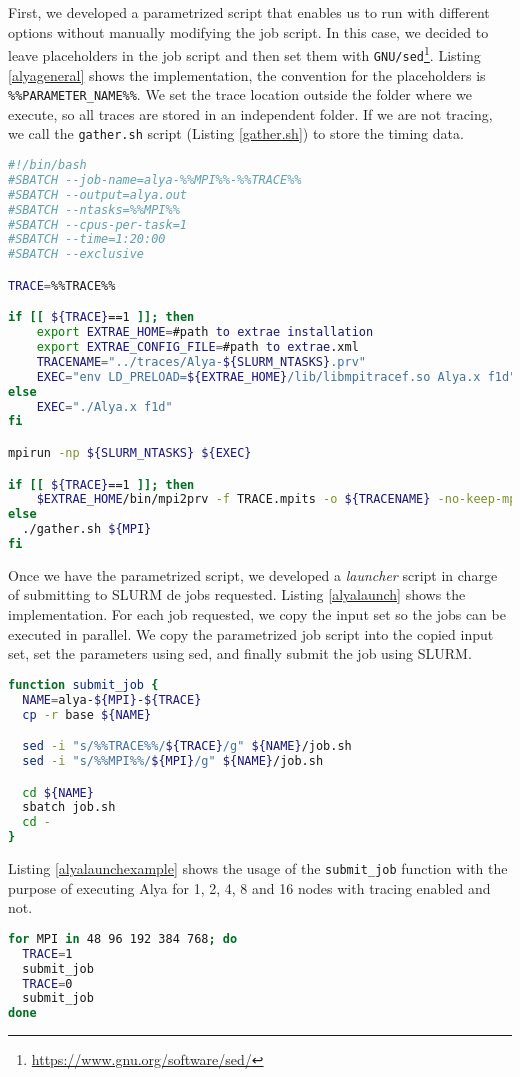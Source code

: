 First, we developed a parametrized script that enables us to run with different options without manually modifying the job script. In this case, we decided to leave placeholders in the job script and then set them with \texttt{GNU/sed}\footnote{\url{https://www.gnu.org/software/sed/}}. Listing \ref{alyageneral} shows the implementation, the convention for the placeholders is \texttt{\%\%PARAMETER\_NAME\%\%}. We set the trace location outside the folder where we execute, so all traces are stored in an independent folder. If we are not tracing, we call the \texttt{gather.sh} script (Listing \ref{gather.sh}) to store the timing data.

\begin{lstlisting}[language=sh, caption={Parametrized alya script.}, label={alyageneral}]
#!/bin/bash
#SBATCH --job-name=alya-%%MPI%%-%%TRACE%%
#SBATCH --output=alya.out
#SBATCH --ntasks=%%MPI%%
#SBATCH --cpus-per-task=1
#SBATCH --time=1:20:00
#SBATCH --exclusive

TRACE=%%TRACE%%

if [[ ${TRACE}==1 ]]; then 
    export EXTRAE_HOME=#path to extrae installation
    export EXTRAE_CONFIG_FILE=#path to extrae.xml
    TRACENAME="../traces/Alya-${SLURM_NTASKS}.prv"
    EXEC="env LD_PRELOAD=${EXTRAE_HOME}/lib/libmpitracef.so Alya.x f1d"
else
    EXEC="./Alya.x f1d"
fi

mpirun -np ${SLURM_NTASKS} ${EXEC}

if [[ ${TRACE}==1 ]]; then
    $EXTRAE_HOME/bin/mpi2prv -f TRACE.mpits -o ${TRACENAME} -no-keep-mpits
else
  ./gather.sh ${MPI}
fi
\end{lstlisting}

Once we have the parametrized script, we developed a \textit{launcher} script in charge of submitting to SLURM de jobs requested. Listing \ref{alyalaunch} shows the implementation. For each job requested, we copy the input set so the jobs can be executed in parallel. We copy the parametrized job script into the copied input set, set the parameters using sed, and finally submit the job using SLURM.

\begin{lstlisting}[language=sh, caption={Alya launcher script.}, label={alyalaunch}]
function submit_job {
  NAME=alya-${MPI}-${TRACE} 
  cp -r base ${NAME}

  sed -i "s/%%TRACE%%/${TRACE}/g" ${NAME}/job.sh
  sed -i "s/%%MPI%%/${MPI}/g" ${NAME}/job.sh

  cd ${NAME}
  sbatch job.sh
  cd -
}

\end{lstlisting}

Listing \ref{alyalaunchexample} shows the usage of the \texttt{submit\_job} function with the purpose of executing Alya for 1, 2, 4, 8 and 16 nodes with tracing enabled and not.

\begin{lstlisting}[language=sh, caption={Alya job launch example.}, label={alyalaunchexample}]
for MPI in 48 96 192 384 768; do
  TRACE=1
  submit_job
  TRACE=0
  submit_job
done
\end{lstlisting}
